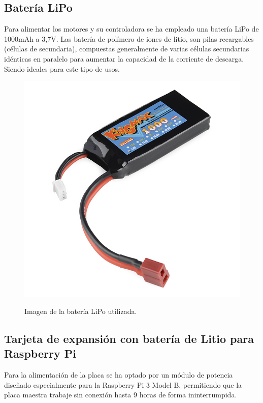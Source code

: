 \subsection{ Batería LiPo }

Para alimentar los motores y su controladora se ha empleado una batería LiPo de 1000mAh a 3,7V. Las batería de polímero de iones de litio, son pilas recargables (células de secundaria), compuestas generalmente de varias células secundarias idénticas en paralelo para aumentar la capacidad 
de la corriente de descarga. Siendo ideales para este tipo de usos.

\begin{figure}[H]
  \begin{center}
    \includegraphics[scale=0.3]{imagenes/robot/bateria-lipo.jpg}\\
    \caption{Imagen de la batería LiPo utilizada.}
  \end{center}
\end{figure}


\subsection{ Tarjeta de expansión con batería de Litio para Raspberry Pi }
\label{componente:bateria-expansion}

Para la alimentación de la placa se ha optado por un módulo de potencia diseñado especialmente para la Raspberry Pi 3 Model B, permitiendo que la placa maestra trabaje sin conexión hasta 9 horas
de forma ininterrumpida.\\

